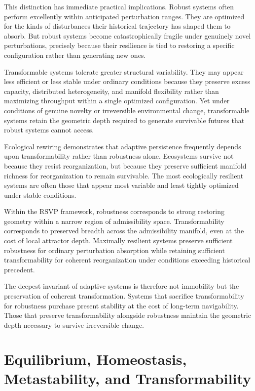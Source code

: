 \documentclass[11pt,a4paper]{article}
\begin{document}
This distinction has immediate practical implications. Robust systems often perform excellently within anticipated perturbation ranges. They are optimized for the kinds of disturbances their historical trajectory has shaped them to absorb. But robust systems become catastrophically fragile under genuinely novel perturbations, precisely because their resilience is tied to restoring a specific configuration rather than generating new ones.

Transformable systems tolerate greater structural variability. They may appear less efficient or less stable under ordinary conditions because they preserve excess capacity, distributed heterogeneity, and manifold flexibility rather than maximizing throughput within a single optimized configuration. Yet under conditions of genuine novelty or irreversible environmental change, transformable systems retain the geometric depth required to generate survivable futures that robust systems cannot access.

Ecological rewiring demonstrates that adaptive persistence frequently depends upon transformability rather than robustness alone. Ecosystems survive not because they resist reorganization, but because they preserve sufficient manifold richness for reorganization to remain survivable. The most ecologically resilient systems are often those that appear most variable and least tightly optimized under stable conditions.

Within the RSVP framework, robustness corresponds to strong restoring geometry within a narrow region of admissibility space. Transformability corresponds to preserved breadth across the admissibility manifold, even at the cost of local attractor depth. Maximally resilient systems preserve sufficient robustness for ordinary perturbation absorption while retaining sufficient transformability for coherent reorganization under conditions exceeding historical precedent.

The deepest invariant of adaptive systems is therefore not immobility but the preservation of coherent transformation. Systems that sacrifice transformability for robustness purchase present stability at the cost of long-term navigability. Those that preserve transformability alongside robustness maintain the geometric depth necessary to survive irreversible change.


\newpage

\section{Equilibrium, Homeostasis, Metastability, and Transformability}
\end{document}
